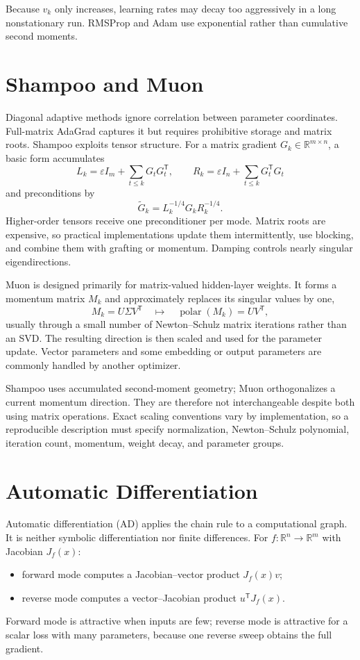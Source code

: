 \documentclass[12pt,oneside]{book}
\numberwithin{equation}{section}
\theoremstyle{definition}
\theoremstyle{plain}
\theoremstyle{remark}
\newcommand{\R}{\mathbb{R}}
\begin{document}
Because $v_k$ only increases, learning rates may decay too aggressively in a
long nonstationary run. RMSProp and Adam use exponential rather than cumulative
second moments.

\section{Shampoo and Muon}

Diagonal adaptive methods ignore correlation between parameter coordinates.
Full-matrix AdaGrad captures it but requires prohibitive storage and matrix
roots. Shampoo exploits tensor structure. For a matrix gradient
$G_k\in\R^{m\times n}$, a basic form accumulates
\[
    L_k=\varepsilon I_m+\sum_{t\leq k}G_tG_t^\mathsf T,\qquad
    R_k=\varepsilon I_n+\sum_{t\leq k}G_t^\mathsf TG_t
\]
and preconditions by
\begin{equation}
    \widetilde G_k=L_k^{-1/4}G_kR_k^{-1/4}.
    \label{eq:shampoo}
\end{equation}
Higher-order tensors receive one preconditioner per mode. Matrix roots are
expensive, so practical implementations update them intermittently, use
blocking, and combine them with grafting or momentum. Damping controls nearly
singular eigendirections.

Muon is designed primarily for matrix-valued hidden-layer weights. It forms a
momentum matrix $M_k$ and approximately replaces its singular values by one,
\[
    M_k=U\Sigma V^\mathsf T
    \quad\longmapsto\quad
    \operatorname{polar}(M_k)=UV^\mathsf T,
\]
usually through a small number of Newton--Schulz matrix iterations rather than
an SVD. The resulting direction is then scaled and used for the parameter
update. Vector parameters and some embedding or output parameters are commonly
handled by another optimizer.

Shampoo uses accumulated second-moment geometry; Muon orthogonalizes a current
momentum direction. They are therefore not interchangeable despite both using
matrix operations. Exact scaling conventions vary by implementation, so a
reproducible description must specify normalization, Newton--Schulz polynomial,
iteration count, momentum, weight decay, and parameter groups.

\section{Automatic Differentiation}

Automatic differentiation (AD) applies the chain rule to a computational
graph. It is neither symbolic differentiation nor finite differences.
For $f:\R^n\to\R^m$ with Jacobian $J_f(x)$:
\begin{itemize}
 \item forward mode computes a Jacobian--vector product $J_f(x)v$;
 \item reverse mode computes a vector--Jacobian product
 $u^\mathsf TJ_f(x)$.
\end{itemize}
Forward mode is attractive when inputs are few; reverse mode is attractive
for a scalar loss with many parameters, because one reverse sweep obtains the
full gradient.
\end{document}
